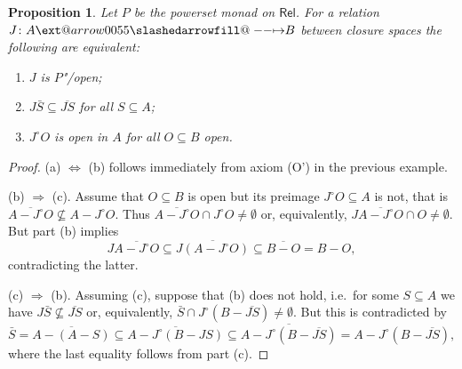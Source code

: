 \documentclass[preprint, a4paper]{elsarticle}
\makeatletter
\def\slashedarrowfill@#1#2#3#4#5{%
  $\m@th\thickmuskip0mu\medmuskip\thickmuskip\thinmuskip\thickmuskip
   \relax#5#1\mkern-7mu%
   \cleaders\hbox{$#5\mkern-2mu#2\mkern-2mu$}\hfill
   \mathclap{#3}\mathclap{#2}%
   \cleaders\hbox{$#5\mkern-2mu#2\mkern-2mu$}\hfill
   \mkern-7mu#4$%
}
\def\rightslashedarrowfill@{%
  \slashedarrowfill@\relbar\relbar\mapstochar\rightarrow}
\newcommand\xslashedrightarrow[2][]{%
  \ext@arrow 0055{\rightslashedarrowfill@}{#1}{#2}}
\def\slashedrightarrow{\xslashedrightarrow{}}
\newtheorem{proposition}[theorem]{Proposition}
\theoremstyle{definition}
\theoremstyle{remark}
\renewcommand{\implies}{\Rightarrow}
\renewcommand{\iff}{\Leftrightarrow}
\providecommand{\isect}{\cap}
\providecommand{\rev}[1]{#1^\circ}
\providecommand{\hmap}[3]{#1\colon#2\slashedrightarrow#3}
\providecommand{\2}{\mathsf 2}
\providecommand{\Rel}{\mathsf{Rel}}
\makeatother
\begin{document}
	\begin{proposition} \label{P-open}
		Let $P$ be the powerset monad on $\Rel$. For a relation $\hmap JAB$ between closure spaces the following are equivalent:
		\begin{enumerate}[label=\textup{(\alph*)}]
			\item $J$ is $P$"/open;
			\item $J\bar S \subseteq \overline{JS}$ for all $S \subseteq A$;
			\item $\rev JO$ is open in $A$ for all $O \subseteq B$ open.
		\end{enumerate}
	\end{proposition}
	\begin{proof}
		(a) $\iff$ (b) follows immediately from axiom (O') in the previous example.
		
		(b) $\implies$ (c). Assume that $O \subseteq B$ is open but its preimage $\rev JO \subseteq A$ is not, that is $\overline{A - \rev JO} \nsubseteq A - \rev JO$. Thus $\overline{A - \rev JO} \isect \rev JO \neq \emptyset$ or, equivalently, $J\overline{A - \rev JO} \isect O \neq \emptyset$. But part (b) implies
		\begin{displaymath}
			J\overline{A - \rev JO} \subseteq \overline{J(A - \rev JO)} \subseteq \overline{B - O} = B - O,
		\end{displaymath}
		contradicting the latter.
		
		(c) $\implies$ (b). Assuming (c), suppose that (b) does not hold, i.e.\ for some $S \subseteq A$ we have $J\bar S \nsubseteq \overline{JS}$ or, equivalently, $\bar S \isect \rev J(B - \overline{JS}) \neq \emptyset$. But this is contradicted by
		\begin{displaymath}
			\bar S = \overline{A - (A - S)} \subseteq \overline{A - \rev J(B - JS)} \subseteq \overline{A - \rev J(B - \overline{JS})} = A - \rev J(B - \overline{JS}),
		\end{displaymath}
		where the last equality follows from part (c).
	\end{proof}
	
\end{document}
